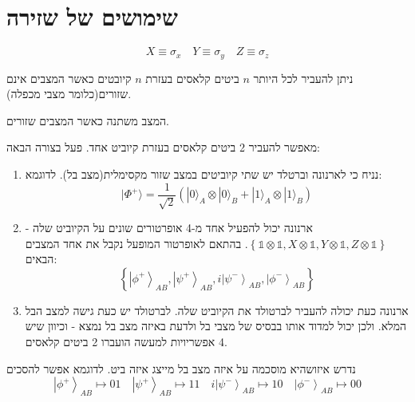\documentclass{tstextbook}
\begin{document}
\section{שימושים של שזירה}

\begin{symbolize}
$$X\equiv \sigma_{x}\quad Y\equiv \sigma_{y}\quad Z\equiv \sigma_{z}$$

\end{symbolize}
\begin{proposition}
ניתן להעביר לכל היותר \(n\) ביטים קלאסים בעזרת \(n\) קיובטים כאשר המצבים אינם שזורים(כלומר מצבי מכפלה).

\end{proposition}
המצב משתנה כאשר המצבים שזורים.

\begin{proposition}
מאפשר להעביר 2 ביטים קלאסים בעזרת קיוביט אחד. פעל בצורה הבאה:

  \begin{enumerate}
    \item נניח כי לארנונה וברטלד יש שתי קיוביטים במצב שזור מקסימלית(מצב בל). לדוגמא: 
$$|\Phi^{+}\rangle=\frac{1}{\sqrt{2}}(|0\rangle_{A}\otimes|0\rangle_{B}+|1\rangle_{A}\otimes|1\rangle_{B})$$


    \item ארנונה יכול להפעיל אחד מ-4 אופרטורים שונים על הקיוביט שלה - \(\left\{\mathbb{1}\otimes\mathbb{1},X\otimes\mathbb{1},Y\otimes\mathbb{1},Z\otimes\mathbb{1}\right\}\). בהתאם לאופרטור המופעל נקבל את אחד המצבים הבאים: 
$$\left\{\left|\phi^{+}\right\rangle_{A B},\left|\psi^{+}\right\rangle_{A B},i\left|\psi^{-}\right\rangle_{A B},\left|\phi^{-}\right\rangle_{A B}\right\}$$


    \item ארנונה כעת יכולה להעביר לברטולד את הקיוביט שלה. לברטולד יש כעת גישה למצב הבל המלא. ולכן יכול למדוד אותו בבסיס של מצבי בל ולדעת באיזה מצב בל נמצא - וכיוון שיש 4 אפשריויות למעשה הועברו 2 ביטים קלאסים. 


  \end{enumerate}
\end{proposition}
\begin{remark}
נדרש איזושהיא מוסכמה על איזה מצב בל מייצג איזה ביט. לדוגמא אפשר להסכים
$$\left|\phi^{+}\right\rangle_{A B}\mapsto 01\quad \left|\psi^{+}\right\rangle_{A B}\mapsto 11\quad i\left|\psi^{-}\right\rangle_{A B} \mapsto 10\quad \left|\phi^{-}\right\rangle_{A B}\mapsto 00$$

\end{remark}
\end{document}
